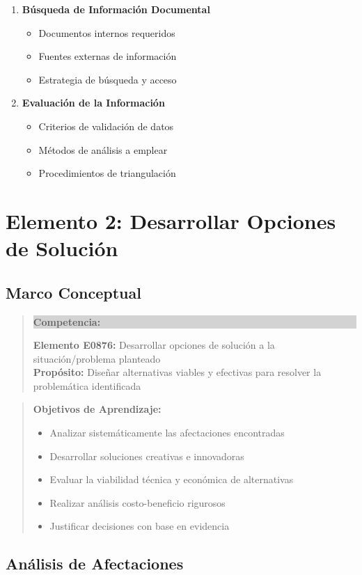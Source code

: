 \documentclass[12pt,letterpaper,oneside]{book}
\newenvironment{objetivos}
{\begin{quote}\color{textgray}\textbf{Objetivos de Aprendizaje:}\begin{itemize}}
{\end{itemize}\end{quote}}
\newenvironment{competencia}
{\begin{quote}\colorbox{lightgray}{\parbox{\dimexpr\linewidth-2\fboxsep}{\textbf{Competencia:}\ }}}
{\end{quote}}
\begin{document}
\begin{enumerate}
\item \textbf{Búsqueda de Información Documental}
   \begin{itemize}
   \item Documentos internos requeridos
   \item Fuentes externas de información
   \item Estrategia de búsqueda y acceso
   \end{itemize}

\item \textbf{Evaluación de la Información}
   \begin{itemize}
   \item Criterios de validación de datos
   \item Métodos de análisis a emplear
   \item Procedimientos de triangulación
   \end{itemize}
\end{enumerate}

\chapter{Elemento 2: Desarrollar Opciones de Solución}

\section{Marco Conceptual}

\begin{competencia}
\textbf{Elemento E0876:} Desarrollar opciones de solución a la situación/problema planteado\\
\textbf{Propósito:} Diseñar alternativas viables y efectivas para resolver la problemática identificada
\end{competencia}

\begin{objetivos}
\item Analizar sistemáticamente las afectaciones encontradas
\item Desarrollar soluciones creativas e innovadoras
\item Evaluar la viabilidad técnica y económica de alternativas
\item Realizar análisis costo-beneficio rigurosos
\item Justificar decisiones con base en evidencia
\end{objetivos}

\section{Análisis de Afectaciones}
\end{document}
